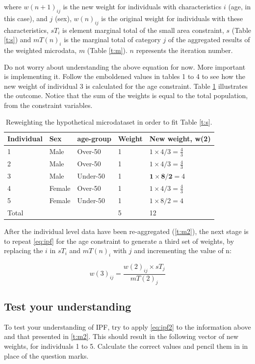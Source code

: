\documentclass[a4paper, 11pt, twoside]{article}
\begin{document}
where $w(n+1)_{ij}$ is the new weight for individuals with characteristics $i$
(age, in this case), and $j$ (sex),  $w(n)_{ij}$ is the original
weight for individuals with these characteristics, $sT_{i}$ is element
marginal total of the small area constraint, $s$
(Table \ref{t:s}) and $mT(n)_{i}$ is the marginal total of category
$j$ of the aggregated results of the weighted
microdata, $m$ (Table \ref{t:m}).
$n$ represents the iteration number.


Do not worry about understanding the above equation for now.
More important is implementing it. Follow the emboldened values in tables 1 to 4
to see how the new weight of individual 3 is calculated for the age constraint.
Table \ref{t:new-weights} illustrates the outcome. Notice that the
sum of the weights is equal to the total population, from the constraint variables.

\begin{table}[htbp]
\centering
\caption{Reweighting the hypothetical microdataset in order to fit
Table \ref{t:s}.}
\begin{tabular}{lllll}
\toprule
{Individual} & {Sex} & {age-group} & {Weight} &
{New weight, w(2)} \\ \midrule
1 & Male & Over-50 & 1 & $1 \times 4/3 = \frac{4}{3}$ \\
2 & Male & Over-50 & 1 & $1 \times 4/3 = \frac{4}{3}$ \\
3 & Male & Under-50 & 1 & $\textbf{1} \times
\textbf{8}/\textbf{2} = 4$ \\
4 & Female & Over-50 & 1 & $1 \times 4/3 = \frac{4}{3}$ \\
5 & Female & Under-50 & 1 & $1 \times 8/2 = 4$ \\
\midrule
Total & & & 5 & 12 \\
\bottomrule
\end{tabular}
\label{t:new-weights}
\end{table}

After the individual level data have been re-aggregated (\cref{t:m2}),
the next stage is to repeat \cref{eq:ipf} for the age constraint to generate a
third set of weights, by replacing
the $i$ in $sT_{i}$ and $mT(n)_{i}$ with $j$ and incrementing the value of n:

\begin{equation}
w(3)_{ij} = \frac{w(2)_{ij} \times sT_{j}}{mT(2)_{j}}
\label{eq:ipf2}
\end{equation}

\subsection{Test your understanding}
To test your understanding of IPF, try to apply \cref{eq:ipf2} to the
information above
and that presented in \cref{t:m2}.
This should result in the following vector of new weights, for individuals 1 to
5. Calculate the correct values and pencil them in in place of the question
marks.  %
\end{document}
